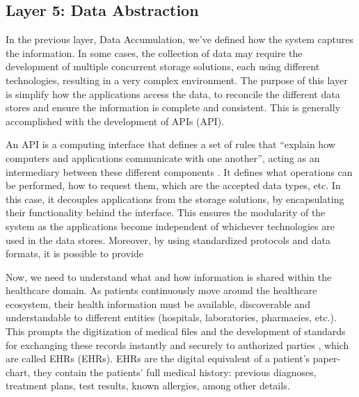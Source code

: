 

\subsection{Layer 5: Data Abstraction}
\label{sec:iot-model-layer5}


In the previous layer, Data Accumulation, we've defined how the system captures the information. In some cases, the collection of data may require the development of multiple concurrent storage solutions, each using different technologies, resulting in a very complex environment. The purpose of this layer is simplify how the applications access the data, to reconcile the different data stores and ensure the information is complete and consistent. This is generally accomplished with the development of \acl{API}s (\acs{API}). \bigskip 

An \acs{API} is a computing interface that defines a set of rules that ``explain how computers and applications communicate with one another'', acting as an intermediary between these different components \cite{IBMAPI}. It defines what operations can be performed, how to request them, which are the accepted data types, etc. In this case, it decouples applications from the storage solutions, by encapsulating their functionality behind the interface. This ensures the modularity of the system as the applications become independent of whichever technologies are used in the data stores. Moreover, by using standardized protocols and data formats, it is possible to provide   \bigskip




Now, we need to understand what and how information is shared within the healthcare domain. As patients continuously move around the healthcare ecosystem, their health information must be available, discoverable and understandable to different entities (hospitals, laboratories, pharmacies, etc.). This prompts the digitization of medical files and the development of standards for exchanging these records instantly and securely to authorized parties \cite{HL72019}, which are called \acl{EHR}s (\acs{EHR}s). \acs{EHR}s are the digital equivalent of a patient's paper-chart, they contain the patients' full medical history: previous diagnoses, treatment plans, test results, known allergies, among other details. \bigskip

